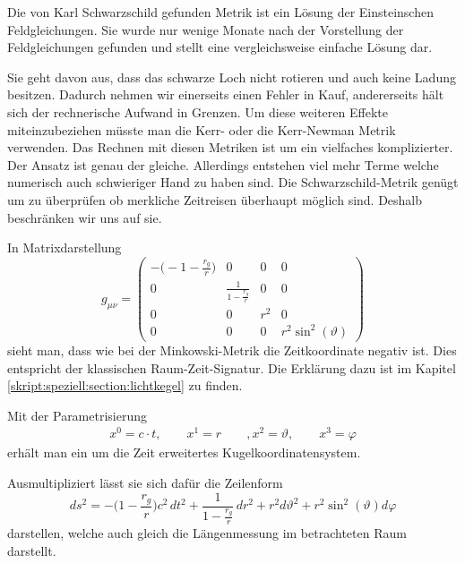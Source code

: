 \begin{refsection}
	Die von Karl Schwarzschild gefunden Metrik ist ein Lösung der Einsteinschen Feldgleichungen. Sie wurde nur wenige Monate nach der Vorstellung der Feldgleichungen gefunden und stellt eine vergleichsweise einfache Lösung dar. 
    
    Sie geht davon aus, dass das schwarze Loch nicht rotieren und auch keine Ladung besitzen. Dadurch nehmen wir einerseits einen Fehler in Kauf, andererseits hält sich der rechnerische Aufwand in Grenzen. Um diese weiteren Effekte miteinzubeziehen müsste man die Kerr- oder die Kerr-Newman Metrik verwenden. Das Rechnen mit diesen Metriken ist um ein vielfaches komplizierter. Der Ansatz ist genau der gleiche. Allerdings entstehen viel mehr Terme welche numerisch auch schwieriger Hand zu haben sind. Die Schwarzschild-Metrik genügt um zu überprüfen ob merkliche Zeitreisen überhaupt möglich sind. Deshalb beschränken wir uns auf sie.
    
	In Matrixdarstellung
	\begin{equation}\label{equation:schwarzschild}
	g_{\mu\nu}=
	\begin{pmatrix}
	-\biggl(-1- \displaystyle \frac{r_{g}}{r}\biggr) & 0 & 0 & 0 \\
	0 & \frac{\displaystyle 1}{\displaystyle1-\frac{r_{g}}{r}} & 0 & 0 \\
	0 & 0 & r^{2} & 0 \\
	0 & 0 & 0 & r^{2}\sin^{2}(\vartheta)
	\end{pmatrix}
	\end{equation}
	sieht man, dass wie bei der Minkowski-Metrik die Zeitkoordinate negativ ist. Dies entspricht der klassischen Raum-Zeit-Signatur. Die Erklärung dazu ist im Kapitel \ref{skript:speziell:section:lichtkegel} zu finden.
    
	Mit der Parametrisierung
	\begin{align*}
	x^{0}=c \cdot t, \qquad
	x^{1}=r \qquad,
	x^{2}=\vartheta, \qquad
	x^{3}=\varphi
	\end{align*}
    erhält man ein um die Zeit erweitertes Kugelkoordinatensystem.
    
	Ausmultipliziert lässt sie sich dafür die Zeilenform
	\begin{equation}
	ds^2
	=
	-\biggl(1-\frac{r_g}r\biggr)c^2\,dt^2
	+
	\frac{1}{\displaystyle 1-\frac{r_g}r}\,dr^2 
	+
	r^2d\vartheta^2 
	+ 
	r^2\sin^2(\vartheta)d\varphi
	\end{equation}
	darstellen, welche auch gleich die Längenmessung im betrachteten Raum darstellt.
	

\end{refsection}
